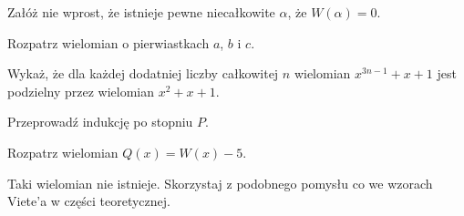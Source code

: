 
\begin{hints_list}
	\item Załóż nie wprost, że istnieje pewne niecałkowite $\alpha$, że $W(\alpha) = 0$.
	\item Rozpatrz wielomian o pierwiastkach $a$, $b$ i $c$.
	\item Wykaż, że dla każdej dodatniej liczby całkowitej $n$ wielomian $x^{3n - 1} + x + 1$ jest podzielny przez wielomian $x^2 + x + 1$.
	\item Przeprowadź indukcję po stopniu $P$.
	\item Rozpatrz wielomian $Q(x) = W(x) - 5$.
	\item Taki wielomian nie istnieje. Skorzystaj z podobnego pomysłu co we wzorach Viete'a w części teoretycznej.
\end{hints_list}